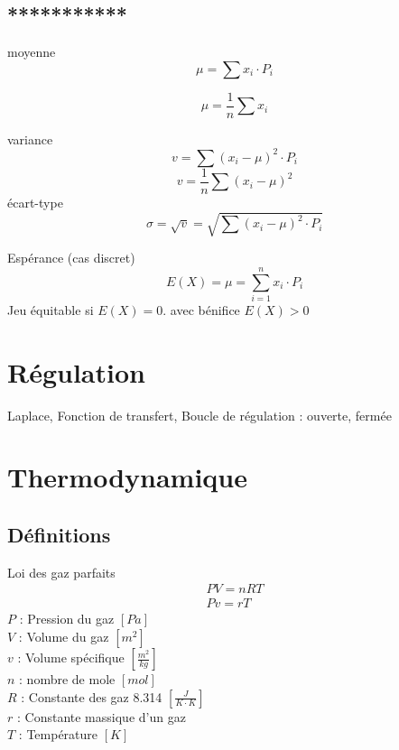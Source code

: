 	\subsection{***********}
	
	moyenne
	\begin{equation}
	\mu=\sum x_i \cdot P_i
	\end{equation}
	
	\begin{equation}
	\mu = \frac{1}{n}\sum x_i
	\end{equation}
	
	variance
	\begin{equation}
	v=\sum (x_i-\mu)^2\cdot P_i
	\end{equation}
	\begin{equation}
	v=\frac{1}{n} \sum (x_i-\mu)^2
	\end{equation}
	écart-type
	\begin{equation}
	\sigma=\sqrt{v}=\sqrt{\sum (x_i-\mu)^2\cdot P_i}
	\end{equation}
	
	Espérance (cas discret)
	\begin{equation}
	E(X)=\mu=\sum_{i=1}^{n}x_i\cdot P_i
	\end{equation}
	Jeu équitable si $E(X)=0$. avec bénifice $E(X)>0$
	
	\newpage
	\section{Régulation}
	
	Laplace, Fonction de transfert, Boucle de régulation : ouverte, fermée
	
	\newpage
	\section{Thermodynamique}
	\subsection{Définitions}
	Loi des gaz parfaits
	\begin{eqnarray}
	PV=nRT\\
	Pv=rT
	\end{eqnarray}
	$P$ : Pression du gaz $[Pa]$\\
	$V$ : Volume du gaz $[m^2]$\\
	$v$ : Volume spécifique $[\frac{m^2}{kg}]$\\
	$n$ : nombre de mole $[mol]$\\
	$R$ : Constante des gaz 8.314 $[\frac{J}{K \cdot K}]$\\
	$r$ : Constante massique d'un gaz \\
	$T$ : Température $[K]$\\
	
